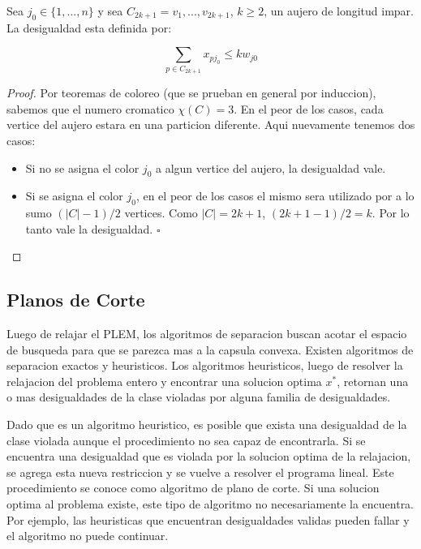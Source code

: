 Sea $j_0 \in \{1,...,n\}$ y sea $C_{2k+1} = v_1,...,v_{2k+1}$, $k \geq 2$, un aujero de longitud impar. La desigualdad esta definida por:

\begin{equation}
\sum_{p \in C_{2k+1}} x_{pj_0} \leq k w_{j0}
\end{equation}

\begin{proof}
Por teoremas de coloreo (que se prueban en general por induccion), sabemos que el numero cromatico $\chi(C) = 3$. En el peor de los casos, cada vertice del aujero estara en una particion diferente. Aqui nuevamente tenemos dos casos:

\begin{itemize}
\item Si no se asigna el color $j_0$ a algun vertice del aujero, la desigualdad vale.
\item Si se asigna el color $j_0$, en el peor de los casos el mismo sera utilizado por a lo sumo $(|C|-1)/2$ vertices. Como $|C| = 2k+1$,  $(2k+1-1)/2 = k$. Por lo tanto vale la desigualdad.  \hfill $\square$
\end{itemize}

\end{proof}

\subsection{Planos de Corte}

Luego de relajar el PLEM, los algoritmos de separacion buscan acotar el espacio de busqueda para que se parezca mas a la capsula convexa. Existen algoritmos de separacion exactos y heuristicos. Los algoritmos heuristicos, luego de resolver la relajacion del problema entero y encontrar una solucion optima $x^*$, retornan una o mas desigualdades de la clase violadas por alguna familia de desigualdades.

Dado que es un algoritmo heuristico, es posible que exista una desigualdad de la clase violada aunque el procedimiento no sea capaz de encontrarla. Si se encuentra una desigualdad que es violada por la solucion optima de la relajacion, se agrega esta nueva restriccion y se vuelve a resolver el programa lineal. Este procedimiento se conoce como algoritmo de plano de corte. Si una solucion optima al problema existe, este tipo de algoritmo no necesariamente la encuentra. Por ejemplo, las heuristicas que encuentran desigualdades validas pueden fallar y el algoritmo no puede continuar.

